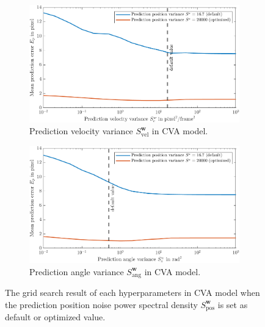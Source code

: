 \begin{figure}
    \ContinuedFloat
    \centering
	\begin{subfigure}[t]{0.8\textwidth}
		\includegraphics[width=\textwidth]{figures/KF/appendix/prev cva.png}
		\caption{Prediction velocity variance $S_{\mathrm{vel}}^{\boldsymbol{w}}$ in CVA model.}
	\end{subfigure}
	\begin{subfigure}[t]{0.8\textwidth}
		\includegraphics[width=\textwidth]{figures/KF/appendix/prea cva.png}
		\caption{Prediction angle variance $S_{\mathrm{ang}}^{\boldsymbol{w}}$ in CVA model.}
	\end{subfigure}
	\caption{The grid search result of each hyperparameters in CVA model when the prediction position noise power spectral density $S_{\mathrm{pos}}^{\boldsymbol{w}}$ is set as default or optimized value.}
	\label{grid search list}
\end{figure}

